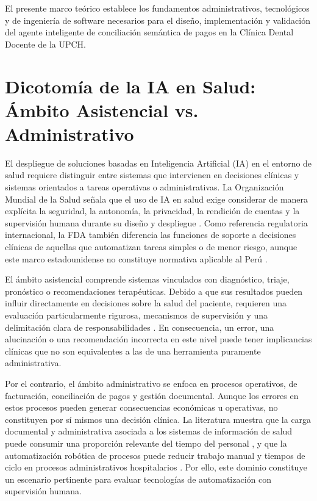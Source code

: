 \label{ch:marco_teorico}
El presente marco teórico establece los fundamentos administrativos, tecnológicos y de ingeniería de software necesarios para el diseño, implementación y validación del agente inteligente de conciliación semántica de pagos en la Clínica Dental Docente de la UPCH.

\section{Dicotomía de la IA en Salud: Ámbito Asistencial vs. Administrativo}

El despliegue de soluciones basadas en Inteligencia Artificial (IA) en el entorno de salud requiere distinguir entre sistemas que intervienen en decisiones clínicas y sistemas orientados a tareas operativas o administrativas. La Organización Mundial de la Salud señala que el uso de IA en salud exige considerar de manera explícita la seguridad, la autonomía, la privacidad, la rendición de cuentas y la supervisión humana durante su diseño y despliegue \cite{who2021ai}. Como referencia regulatoria internacional, la FDA también diferencia las funciones de soporte a decisiones clínicas de aquellas que automatizan tareas simples o de menor riesgo, aunque este marco estadounidense no constituye normativa aplicable al Perú \cite{fda2026cds}.

El ámbito asistencial comprende sistemas vinculados con diagnóstico, triaje, pronóstico o recomendaciones terapéuticas. Debido a que sus resultados pueden influir directamente en decisiones sobre la salud del paciente, requieren una evaluación particularmente rigurosa, mecanismos de supervisión y una delimitación clara de responsabilidades \cite{who2021ai}. En consecuencia, un error, una alucinación o una recomendación incorrecta en este nivel puede tener implicancias clínicas que no son equivalentes a las de una herramienta puramente administrativa.

Por el contrario, el ámbito administrativo se enfoca en procesos operativos, de facturación, conciliación de pagos y gestión documental. Aunque los errores en estos procesos pueden generar consecuencias económicas u operativas, no constituyen por sí mismos una decisión clínica. La literatura muestra que la carga documental y administrativa asociada a los sistemas de información de salud puede consumir una proporción relevante del tiempo del personal \cite{murad2024burden}, y que la automatización robótica de procesos puede reducir trabajo manual y tiempos de ciclo en procesos administrativos hospitalarios \cite{huang2024rpa}. Por ello, este dominio constituye un escenario pertinente para evaluar tecnologías de automatización con supervisión humana.


